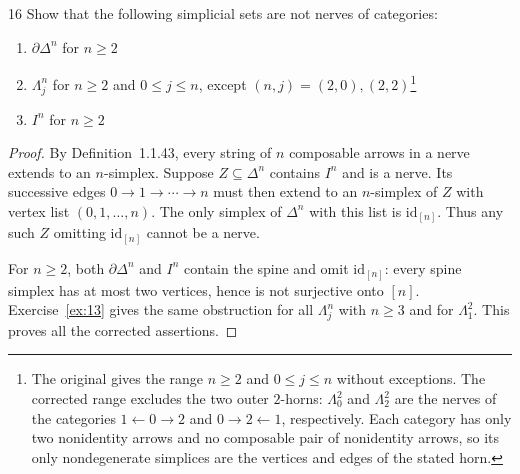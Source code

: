 \begin{exercise}{16}
Show that the following simplicial sets are not nerves of categories:
\begin{enumerate}[label=(\arabic*),leftmargin=*,itemsep=0pt,parsep=0pt,
                  topsep=.5\baselineskip]
 \item $\partial\Delta^n$ for $n\ge2$
 \item $\Lambda^n_j$ for $n\ge2$ and $0\le j\le n$, except
 $(n,j)=(2,0),(2,2)$\footnote{The original gives the range
 $n\ge2$ and $0\le j\le n$ without exceptions. The corrected range
 excludes the two outer $2$-horns: $\Lambda^2_0$ and $\Lambda^2_2$
 are the nerves of the categories $1\leftarrow0\to2$ and
 $0\to2\leftarrow1$, respectively. Each category has only two
 nonidentity arrows and no composable pair of nonidentity arrows,
 so its only nondegenerate simplices are the vertices and edges of
 the stated horn.}
 \item $I^n$ for $n\ge2$
\end{enumerate}

\begin{proof}
By Definition~1.1.43, every string of $n$ composable arrows in a nerve
extends to an $n$-simplex. Suppose $Z\subseteq\Delta^n$ contains
$I^n$ and is a nerve. Its successive edges
$0\to1\to\cdots\to n$ must then extend to an $n$-simplex of $Z$
with vertex list $(0,1,\ldots,n)$. The only simplex of $\Delta^n$
with this list is $\mathrm{id}_{[n]}$. Thus any such $Z$ omitting
$\mathrm{id}_{[n]}$ cannot be a nerve.

For $n\ge2$, both $\partial\Delta^n$ and $I^n$ contain the spine
and omit $\mathrm{id}_{[n]}$: every spine simplex has at most two
vertices, hence is not surjective onto $[n]$.
Exercise~\ref{ex:13} gives the same obstruction for all
$\Lambda^n_j$ with $n\ge3$ and for $\Lambda^2_1$.
This proves all the corrected assertions.
\end{proof}
\end{exercise}
